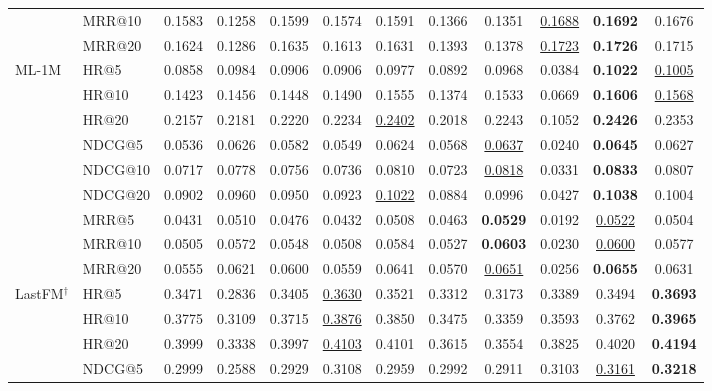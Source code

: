 \documentclass[sigconf,review,anonymous]{acmart}
\newcommand{\tblbest}[1]{\textbf{#1}}
\newcommand{\tblsecond}[1]{\underline{#1}}
\begin{document}
\begin{table}[!t]
{\begin{tabular}{ll*{9}{c}>{\columncolor{routerecgray}}c}
      & MRR@10  & 0.1583 & 0.1258 & 0.1599 & 0.1574 & 0.1591 & 0.1366 & 0.1351 & \tblsecond{0.1688} & \tblbest{0.1692} & 0.1676 \\
      & MRR@20  & 0.1624 & 0.1286 & 0.1635 & 0.1613 & 0.1631 & 0.1393 & 0.1378 & \tblsecond{0.1723} & \tblbest{0.1726} & 0.1715 \\
    \midrule
    \multirow{9}{*}{ML-1M}
      & HR@5    & 0.0858 & 0.0984 & 0.0906 & 0.0906 & 0.0977 & 0.0892 & 0.0968 & 0.0384 & \tblbest{0.1022} & \tblsecond{0.1005} \\
      & HR@10   & 0.1423 & 0.1456 & 0.1448 & 0.1490 & 0.1555 & 0.1374 & 0.1533 & 0.0669 & \tblbest{0.1606} & \tblsecond{0.1568} \\
      & HR@20   & 0.2157 & 0.2181 & 0.2220 & 0.2234 & \tblsecond{0.2402} & 0.2018 & 0.2243 & 0.1052 & \tblbest{0.2426} & 0.2353 \\
      & NDCG@5  & 0.0536 & 0.0626 & 0.0582 & 0.0549 & 0.0624 & 0.0568 & \tblsecond{0.0637} & 0.0240 & \tblbest{0.0645} & 0.0627 \\
      & NDCG@10 & 0.0717 & 0.0778 & 0.0756 & 0.0736 & 0.0810 & 0.0723 & \tblsecond{0.0818} & 0.0331 & \tblbest{0.0833} & 0.0807 \\
      & NDCG@20 & 0.0902 & 0.0960 & 0.0950 & 0.0923 & \tblsecond{0.1022} & 0.0884 & 0.0996 & 0.0427 & \tblbest{0.1038} & 0.1004 \\
      & MRR@5   & 0.0431 & 0.0510 & 0.0476 & 0.0432 & 0.0508 & 0.0463 & \tblbest{0.0529} & 0.0192 & \tblsecond{0.0522} & 0.0504 \\
      & MRR@10  & 0.0505 & 0.0572 & 0.0548 & 0.0508 & 0.0584 & 0.0527 & \tblbest{0.0603} & 0.0230 & \tblsecond{0.0600} & 0.0577 \\
      & MRR@20  & 0.0555 & 0.0621 & 0.0600 & 0.0559 & 0.0641 & 0.0570 & \tblsecond{0.0651} & 0.0256 & \tblbest{0.0655} & 0.0631 \\
    \midrule
    \multirow{9}{*}{LastFM$^\dagger$}
      & HR@5    & 0.3471 & 0.2836 & 0.3405 & \tblsecond{0.3630} & 0.3521 & 0.3312 & 0.3173 & 0.3389 & 0.3494 & \tblbest{0.3693} \\
      & HR@10   & 0.3775 & 0.3109 & 0.3715 & \tblsecond{0.3876} & 0.3850 & 0.3475 & 0.3359 & 0.3593 & 0.3762 & \tblbest{0.3965} \\
      & HR@20   & 0.3999 & 0.3338 & 0.3997 & \tblsecond{0.4103} & 0.4101 & 0.3615 & 0.3554 & 0.3825 & 0.4020 & \tblbest{0.4194} \\
      & NDCG@5  & 0.2999 & 0.2588 & 0.2929 & 0.3108 & 0.2959 & 0.2992 & 0.2911 & 0.3103 & \tblsecond{0.3161} & \tblbest{0.3218} \\

\end{tabular}}
\end{table}
\end{document}

